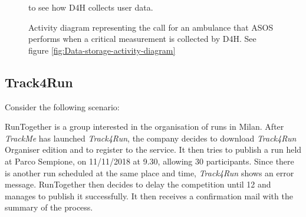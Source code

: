             \begin{figure}[H]
                \centering
                \caption{Activity diagram representing the call for an ambulance that ASOS performs when a critical measurement is collected by D4H. See figure \ref{fig:Data-storage-activity-diagram}} to see how D4H collects user data.
                \label{fig:ASOS-activity-diagram1}
            \end{figure}
            
    \subsection{Track4Run}
        Consider the following scenario:
        
        RunTogether is a group interested in the organisation of runs in Milan. After \emph{TrackMe} has launched \emph{Track4Run}, the company decides to download \emph{Track4Run} Organiser edition and to register to the service. It then tries to publish a run held at Parco Sempione, on 11/11/2018 at 9.30, allowing 30 participants. Since there is another run scheduled at the same place and time, \emph{Track4Run} shows an error message. RunTogether then decides to delay the competition until 12 and manages to publish it successfully. It then receives a confirmation mail with the summary of the process.
        
